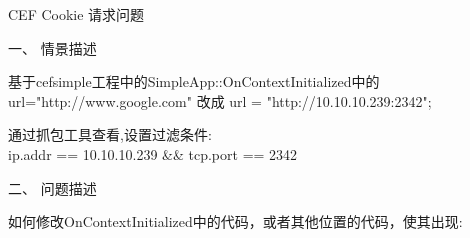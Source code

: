 \documentclass[AutoFakeBold,AutoFakeSlant]{article}
\begin{document}
	
	\begin{center}
		\Huge 
		CEF Cookie 请求问题
	\end{center}
	
	\leftline
	\bigskip
	\begin{flushleft}
		\begin{huge}
			一、 情景描述
		\end{huge}
		
		\large 
		\linespread{1.2} \selectfont
		基于cefsimple工程中的SimpleApp::OnContextInitialized中的
		url="http://www.google.com"
		改成
		url = "http://10.10.10.239:2342";
		
		\bigskip
		
		通过抓包工具查看,设置过滤条件:\\	
		ip.addr == 10.10.10.239 \&\& tcp.port == 2342
	\end{flushleft}
	
	
	
	\begin{flushleft}
		\begin{figure*}[htbp]
			\centering
			\subfigure[在没有设置cookie之前]{
				\texttt{[image: 1]}
			} 
			
			\vspace{1cm}
			
			\subfigure[响应页面结果]{
			\texttt{[image: NG]}
			} 
		\end{figure*}
	\end{flushleft}
	
	\newpage
	
	
	\begin{flushleft}
		\begin{huge}
			二、 问题描述
		\end{huge}
		
		\large 
		\linespread{1.2} \selectfont
		如何修改OnContextInitialized中的代码，或者其他位置的代码，使其出现:
	\end{flushleft}
	\begin{flushleft}
		\begin{figure*}[htbp]
			\centering
			\subfigure[在没有设置cookie之前]{
				\texttt{[image: 2]}
			} 
			
			\vspace{1cm}
			
			\subfigure[响应页面结果]{
				\texttt{[image: OK]}
			} 
		\end{figure*}
	\end{flushleft}
	
\end{document}
